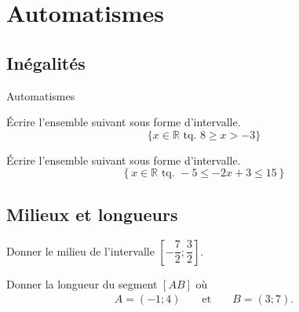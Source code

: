 \documentclass[14pt]{beamer}
\newcommand{\R}{\mathbb{R}}
\begin{document}
\section{Automatismes}

\subsection{Inégalités}

\begin{frame}

\centering \huge
Automatismes

\end{frame}


\begin{frame}{1}
	Écrire l'ensemble suivant sous forme d'intervalle.
		\[ \{ x \in \R \text{ tq. } 8 \geq x > -3 \} \]
	
\end{frame}

\begin{frame}{2}

	Écrire l'ensemble suivant sous forme d'intervalle.
		\[ \left\{ x \in \R \text{ tq. } {-}5 \leq  {-}2x + 3 \leq 15 \right\} \]

\end{frame}

\subsection{Milieux et longueurs}

\begin{frame}{3}

	Donner le milieu de l'intervalle $\left[-\dfrac72 ; \dfrac32\right]$.

\end{frame}


\begin{frame}{4}

	Donner la longueur du segment $[AB]$ où
		\begin{align*}
			A = ({-}1 ; 4) &&  \text{ et } && B = (3 ; 7).
		\end{align*}

\end{frame}
\end{document}
